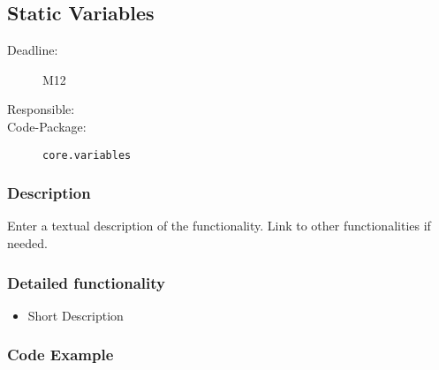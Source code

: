 \newpage
\subsection{Static Variables}
\label{Functionality:ID}

\begin{description}
\item[Deadline:] M12
\item[Responsible:]
\item[Code-Package:] \texttt{core.variables}
\end{description}

\subsubsection*{Description}

Enter a textual description of the functionality. Link to other functionalities if needed. 

\subsubsection*{Detailed functionality}

\begin{itemize}
\item Short Description
\end{itemize}

\subsubsection*{Code Example}

